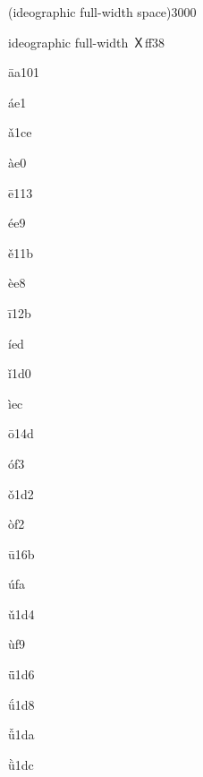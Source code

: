 \documentclass[avery5371,grid]{flashcards}
\newcommand{\fl}[2]{\begin{flashcard}{\Huge{#1}}{#2}\end{flashcard}}
\begin{document}
\fl{(ideographic full-width space)}{3000}

\fl{ideographic full-width Ｘ}{ff38}

\fl{ā}{a101}

\fl{á}{e1}

\fl{ǎ}{1ce}

\fl{à}{e0}

\fl{ē}{113}

\fl{é}{e9}

\fl{ě}{11b}

\fl{è}{e8}

\fl{ī}{12b}

\fl{í}{ed}

\fl{ǐ}{1d0}

\fl{ì}{ec}

\fl{ō}{14d}

\fl{ó}{f3}

\fl{ǒ}{1d2}

\fl{ò}{f2}

\fl{ū}{16b}

\fl{ú}{fa}

\fl{ǔ}{1d4}

\fl{ù}{f9}

\fl{ǖ}{1d6}

\fl{ǘ}{1d8}

\fl{ǚ}{1da}

\fl{ǜ}{1dc}
\end{document}
